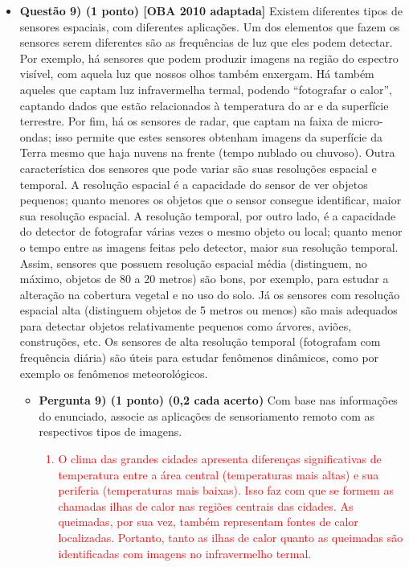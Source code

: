 \documentclass[a4paper, 12pt]{article}
\newcommand{\red}[1]{\textcolor{red}{#1}}
\begin{document}
\begin{flushleft}
\begin{itemize}
            \item \textbf{Questão 9) (1 ponto) [OBA 2010 adaptada]} Existem diferentes tipos de sensores espaciais, com diferentes aplicações. \linebreak \linebreak Um dos elementos que fazem os sensores serem diferentes são as frequências de luz que eles podem detectar. Por exemplo, há sensores que podem produzir imagens na região do espectro visível, com aquela luz que nossos olhos também enxergam. Há também aqueles que captam luz infravermelha termal, podendo “fotografar o calor”, captando dados que estão relacionados à temperatura do ar e da superfície terrestre. Por fim, há os sensores de radar, que captam na faixa de micro-ondas; isso permite que estes sensores obtenham imagens da superfície da Terra mesmo que haja nuvens na frente (tempo nublado ou chuvoso). \linebreak \linebreak Outra característica dos sensores que pode variar são suas resoluções espacial e temporal. A resolução espacial é a capacidade do sensor de ver objetos pequenos; quanto menores os objetos que o sensor consegue identificar, maior sua resolução espacial. A resolução temporal, por outro lado, é a capacidade do detector de fotografar várias vezes o mesmo objeto ou local; quanto menor o tempo entre as imagens feitas pelo detector, maior sua resolução temporal. \linebreak \linebreak Assim, sensores que possuem resolução espacial média (distinguem, no máximo, objetos de 80 a 20 metros) são bons, por exemplo, para estudar a alteração na cobertura vegetal e no uso do solo. Já os sensores com resolução espacial alta (distinguem objetos de 5 metros ou menos) são mais adequados para detectar objetos relativamente pequenos como árvores, aviões, construções, etc. Os sensores de alta resolução temporal (fotografam com frequência diária) são úteis para estudar fenômenos dinâmicos, como por exemplo os fenômenos meteorológicos.
                \begin{itemize}
                    \item \textbf{Pergunta 9) (1 ponto) (0,2 cada acerto)} Com base nas informações do enunciado, associe as aplicações de sensoriamento remoto com as respectivos tipos de imagens.
                        \red{\begin{enumerate}
                            \item O  clima  das  grandes  cidades  apresenta  diferenças  significativas  de  temperatura  entre  a  área  central (temperaturas  mais  altas)  e  sua  periferia  (temperaturas  mais  baixas).  Isso  faz  com  que  se  formem  as chamadas ilhas de calor nas regiões centrais das cidades.  As queimadas, por sua vez, também representam fontes  de  calor  localizadas.    Portanto,  tanto  as  ilhas  de  calor  quanto  as  queimadas  são  identificadas com imagens no infravermelho termal.

\end{enumerate}}
\end{itemize}
\end{itemize}
\end{flushleft}
\end{document}
